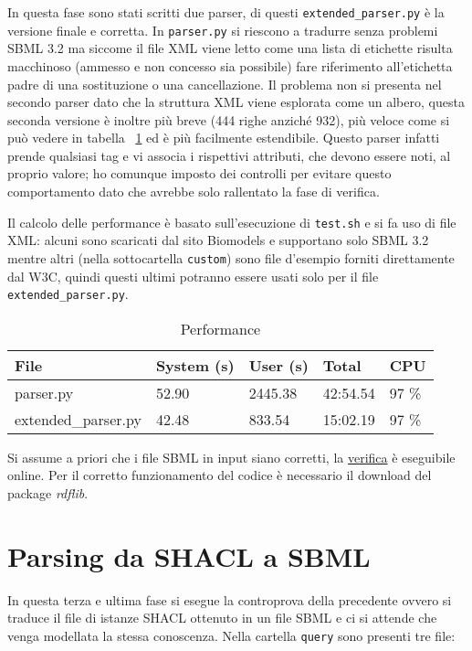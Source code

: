 \documentclass{article}
\begin{document}
In questa fase sono stati scritti due parser, di questi \texttt{extended\_parser.py} è la versione finale e corretta. In \texttt{parser.py} si riescono a tradurre senza problemi SBML 3.2 ma siccome il file XML viene letto come una lista di etichette risulta macchinoso (ammesso e non concesso sia possibile) fare riferimento all'etichetta padre di una sostituzione o una cancellazione. Il problema non si presenta nel secondo parser dato che la struttura XML viene esplorata come un albero, questa seconda versione è inoltre più breve (444 righe anziché 932), più veloce come si può vedere in tabella ~\ref{tab:performance} ed è più facilmente estendibile. Questo parser infatti prende qualsiasi tag e vi associa i rispettivi attributi, che devono essere noti, al proprio valore; ho comunque imposto dei controlli per evitare questo comportamento dato che avrebbe solo rallentato la fase di verifica.

Il calcolo delle performance è basato sull'esecuzione di \texttt{test.sh} e si fa uso di file XML: alcuni sono scaricati dal sito Biomodels e supportano solo SBML 3.2 mentre altri (nella sottocartella \texttt{custom}) sono file d'esempio forniti direttamente dal W3C, quindi questi ultimi potranno essere usati solo per il file \texttt{extended\_parser.py}. 

\begin{table}[h!t] 
    \centering
    \begin{longtable}{p{3.3cm}p{2cm}p{1.5cm}p{1.5cm}p{1.5cm}}
        \textbf{File} & \textbf{System (s)} & \textbf{User (s)} & \textbf{Total} & \textbf{CPU} \\
        \hline
        parser.py & 52.90 & 2445.38 & 42:54.54 & 97 \% \\
        extended\_parser.py & 42.48 & 833.54 & 15:02.19 & 97 \% \\
        \hline
    \end{longtable}
    \caption{Performance}
    \label{tab:performance}
\end{table}

Si assume a priori che i file SBML in input siano corretti, la \href{http://sbml.org/Facilities/Validator}{verifica} è eseguibile online. Per il corretto funzionamento del codice è necessario il download del package \textit{rdflib}.

\section{Parsing da SHACL a SBML}
In questa terza e ultima fase si esegue la controprova della precedente ovvero si traduce il file di istanze SHACL ottenuto in un file SBML e ci si attende che venga modellata la stessa conoscenza. Nella cartella \texttt{query} sono presenti tre file:
\end{document}
